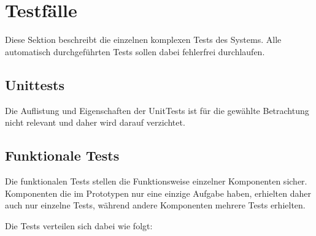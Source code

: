 \section{Testfälle}

Diese Sektion beschreibt die einzelnen komplexen Tests des Systems.
Alle automatisch durchgeführten Tests sollen dabei fehlerfrei durchlaufen.

\subsection{Unittests}

Die Auflistung und Eigenschaften der UnitTests
ist für die gewählte Betrachtung nicht relevant und
daher wird darauf verzichtet.

\subsection{Funktionale Tests}
Die funktionalen Tests stellen die Funktionsweise einzelner Komponenten sicher.
Komponenten die im Prototypen nur eine einzige Aufgabe haben,
erhielten daher auch nur einzelne Tests, während andere Komponenten mehrere Tests erhielten.

Die Tests verteilen sich dabei wie folgt:

